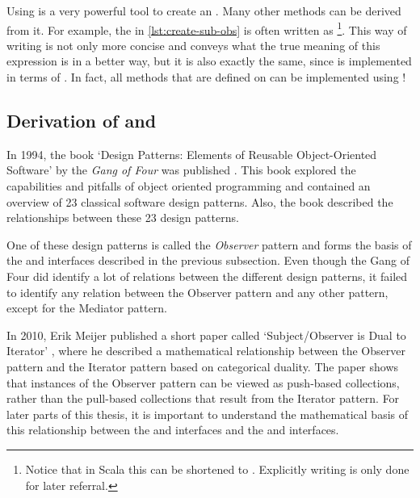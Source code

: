 Using  is a very powerful tool to create an \obs. Many other methods can be derived from it. For example, the \obs in \autoref{lst:create-sub-obs} is often written as \footnote{Notice that in Scala this can be shortened to . Explicitly writing  is only done for later referral.}. This way of writing is not only more concise and conveys what the true meaning of this expression is in a better way, but it is also exactly the same, since  is implemented in terms of . In fact, all methods that are defined on \obs can be implemented using !

\subsection{Derivation of \obs and \obv}
In 1994, the book `Design Patterns: Elements of Reusable Object-Oriented Software' by the \textit{Gang of Four} was published . This book explored the capabilities and pitfalls of object oriented programming and contained an overview of 23 classical software design patterns. Also, the book described the relationships between these 23 design patterns.

One of these design patterns is called the \textit{Observer} pattern and forms the basis of the \obs and \obv interfaces described in the previous subsection. Even though the Gang of Four did identify a lot of relations between the different design patterns, it failed to identify any relation between the Observer pattern and any other pattern, except for the Mediator pattern.

In 2010, Erik Meijer published a short paper called `Subject/Observer is Dual to Iterator' , where he described a mathematical relationship between the Observer pattern and the Iterator pattern based on categorical duality. The paper shows that instances of the Observer pattern can be viewed as push-based collections, rather than the pull-based collections that result from the Iterator pattern. For later parts of this thesis, it is important to understand the mathematical basis of this relationship between the \obs and \obv interfaces and the \itb and \itr interfaces.

